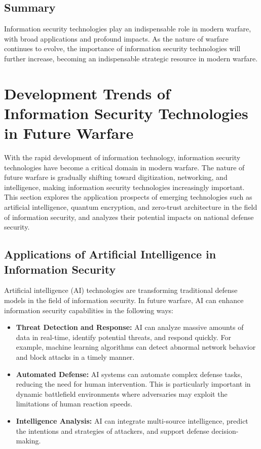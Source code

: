 \documentclass[12pt, a4paper]{article}
\begin{document}
\subsection{Summary}

Information security technologies play an indispensable role in modern warfare, with broad applications and profound impacts. As the nature of warfare continues to evolve, the importance of information security technologies will further increase, becoming an indispensable strategic resource in modern warfare.

\section{Development Trends of Information Security Technologies in Future Warfare}
\label{sec:infosec_trends}

With the rapid development of information technology, information security technologies have become a critical domain in modern warfare. The nature of future warfare is gradually shifting toward digitization, networking, and intelligence, making information security technologies increasingly important. This section explores the application prospects of emerging technologies such as artificial intelligence, quantum encryption, and zero-trust architecture in the field of information security, and analyzes their potential impacts on national defense security.

\subsection{Applications of Artificial Intelligence in Information Security}
Artificial intelligence (AI) technologies are transforming traditional defense models in the field of information security. In future warfare, AI can enhance information security capabilities in the following ways:

\begin{itemize}
    \item \textbf{Threat Detection and Response:} AI can analyze massive amounts of data in real-time, identify potential threats, and respond quickly. For example, machine learning algorithms can detect abnormal network behavior and block attacks in a timely manner.
    \item \textbf{Automated Defense:} AI systems can automate complex defense tasks, reducing the need for human intervention. This is particularly important in dynamic battlefield environments where adversaries may exploit the limitations of human reaction speeds.
    \item \textbf{Intelligence Analysis:} AI can integrate multi-source intelligence, predict the intentions and strategies of attackers, and support defense decision-making.
\end{itemize}
\end{document}
